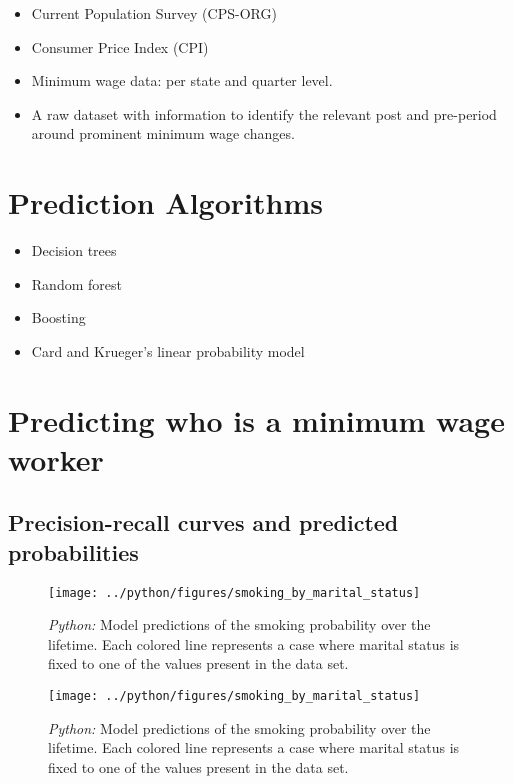 \documentclass[11pt, a4paper, leqno]{article}
\begin{document}
\begin{itemize}

    \item Current Population Survey (CPS-ORG)
    \item Consumer Price Index (CPI)
    \item Minimum wage data:  per state and quarter level.
    \item A raw dataset with information 
    to identify the relevant post and pre-period around prominent minimum wage changes. 

\end{itemize}


\section{Prediction Algorithms}
\label{sec: algorithms}

\begin{itemize}
\item Decision trees
\item Random forest
\item Boosting
\item Card and Krueger's linear probability model 
\end{itemize}

\section{Predicting who is a minimum wage worker} %
\label{sec:prediction}

\subsection{Precision-recall curves and predicted probabilities}

\begin{figure}[H]

    \centering
    \texttt{[image: ../python/figures/smoking\_by\_marital\_status]}

    \caption{\emph{Python:} Model predictions of the smoking probability over the
        lifetime. Each colored line represents a case where marital status is fixed to one
        of the values present in the data set.}
    \label{fig:python-predictions}

\end{figure}

\begin{figure}[H]

    \centering
    \texttt{[image: ../python/figures/smoking\_by\_marital\_status]}

    \caption{\emph{Python:} Model predictions of the smoking probability over the
        lifetime. Each colored line represents a case where marital status is fixed to one
        of the values present in the data set.}
    \label{fig:python-predictions}

\end{figure}
\end{document}
